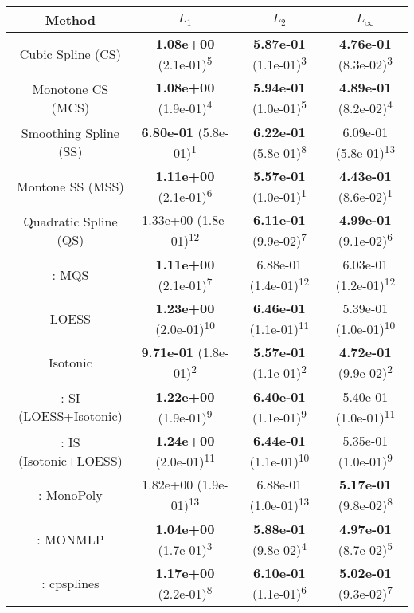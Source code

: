 \begin{tabular}{cccc}
\toprule
Method&$L_1$&$L_2$&$L_\infty$\tabularnewline
\midrule
Cubic Spline (CS)& \textbf{1.08e+00} (2.1e-01)\textsuperscript{5}& \textbf{5.87e-01} (1.1e-01)\textsuperscript{3}& \textbf{4.76e-01} (8.3e-02)\textsuperscript{3}\tabularnewline
Monotone CS (MCS)& \textbf{1.08e+00} (1.9e-01)\textsuperscript{4}& \textbf{5.94e-01} (1.0e-01)\textsuperscript{5}& \textbf{4.89e-01} (8.2e-02)\textsuperscript{4}\tabularnewline
Smoothing Spline (SS)& \textbf{6.80e-01} (5.8e-01)\textsuperscript{1}& \textbf{6.22e-01} (5.8e-01)\textsuperscript{8}& 6.09e-01 (5.8e-01)\textsuperscript{13}\tabularnewline
Montone SS (MSS)& \textbf{1.11e+00} (2.1e-01)\textsuperscript{6}& \textbf{5.57e-01} (1.0e-01)\textsuperscript{1}& \textbf{4.43e-01} (8.6e-02)\textsuperscript{1}\tabularnewline
Quadratic Spline (QS)& 1.33e+00 (1.8e-01)\textsuperscript{12}& \textbf{6.11e-01} (9.9e-02)\textsuperscript{7}& \textbf{4.99e-01} (9.1e-02)\textsuperscript{6}\tabularnewline
\textcite{heMonotoneBsplineSmoothing1998}: MQS& \textbf{1.11e+00} (2.1e-01)\textsuperscript{7}& 6.88e-01 (1.4e-01)\textsuperscript{12}& 6.03e-01 (1.2e-01)\textsuperscript{12}\tabularnewline
LOESS& \textbf{1.23e+00} (2.0e-01)\textsuperscript{10}& \textbf{6.46e-01} (1.1e-01)\textsuperscript{11}& 5.39e-01 (1.0e-01)\textsuperscript{10}\tabularnewline
Isotonic& \textbf{9.71e-01} (1.8e-01)\textsuperscript{2}& \textbf{5.57e-01} (1.1e-01)\textsuperscript{2}& \textbf{4.72e-01} (9.9e-02)\textsuperscript{2}\tabularnewline
\textcite{mammenEstimatingSmoothMonotone1991}: SI (LOESS+Isotonic)& \textbf{1.22e+00} (1.9e-01)\textsuperscript{9}& \textbf{6.40e-01} (1.1e-01)\textsuperscript{9}& 5.40e-01 (1.0e-01)\textsuperscript{11}\tabularnewline
\textcite{mammenEstimatingSmoothMonotone1991}: IS (Isotonic+LOESS)& \textbf{1.24e+00} (2.0e-01)\textsuperscript{11}& \textbf{6.44e-01} (1.1e-01)\textsuperscript{10}& 5.35e-01 (1.0e-01)\textsuperscript{9}\tabularnewline
\textcite{murrayFastFlexibleMethods2016a}: MonoPoly& 1.82e+00 (1.9e-01)\textsuperscript{13}& 6.88e-01 (1.0e-01)\textsuperscript{13}& \textbf{5.17e-01} (9.8e-02)\textsuperscript{8}\tabularnewline
\textcite{cannonMonmlpMultilayerPerceptron2017}: MONMLP& \textbf{1.04e+00} (1.7e-01)\textsuperscript{3}& \textbf{5.88e-01} (9.8e-02)\textsuperscript{4}& \textbf{4.97e-01} (8.7e-02)\textsuperscript{5}\tabularnewline
\textcite{navarro-garciaConstrainedSmoothingOutofrange2023}: cpsplines& \textbf{1.17e+00} (2.2e-01)\textsuperscript{8}& \textbf{6.10e-01} (1.1e-01)\textsuperscript{6}& \textbf{5.02e-01} (9.3e-02)\textsuperscript{7}\tabularnewline
\bottomrule
\end{tabular}
